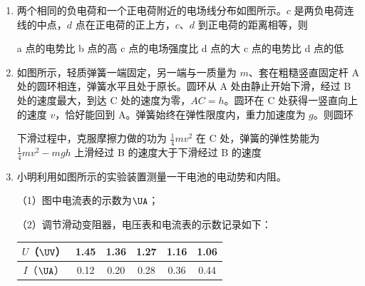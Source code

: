 \documentclass[\gkver]{gaokaozhenti}
\begin{document}
\begin{enumerate}
\item
两个相同的负电荷和一个正电荷附近的电场线分布如图所示。$c$ 是两负电荷连线的中点，$d$ 点在正电荷的正上方，$c$、$d$ 到正电荷的距离相等，则


{a 点的电势比 b 点的高}
{c 点的电场强度比 d 点的大}
{c 点的电势比 d 点的低}


\item
如图所示，轻质弹簧一端固定，另一端与一质量为 $m$、套在粗糙竖直固定杆 A 处的圆环相连，弹簧水平且处于原长。圆环从 A 处由静止开始下滑，经过 B 处的速度最大，到达 C 处的速度为零，$AC=h$。圆环在 C 处获得一竖直向上的速度 $v$，恰好能回到 A。弹簧始终在弹性限度内，重力加速度为 $g$。则圆环


{下滑过程中，克服摩擦力做的功为 $\frac{1}{4}mv^{2}$}
{在 C 处，弹簧的弹性势能为 $\frac{1}{4}mv^{2}-mgh$}
{上滑经过 B 的速度大于下滑经过 B 的速度}


\item
小明利用如图所示的实验装置测量一干电池的电动势和内阻。


（1）图中电流表的示数为$\UA$；

（2）调节滑动变阻器，电压表和电流表的示数记录如下：

\begin{center}
\begin{tabular}{|c|c|c|c|c|c|}
\hline
$U$（$\UV$） & 1.45 & 1.36 & 1.27 & 1.16 & 1.06 \\
\hline
$I$（$\UA$） & 0.12 & 0.20 & 0.28 & 0.36 & 0.44 \\
\hline
\end{tabular}
\end{center}


\end{enumerate}
\end{document}
